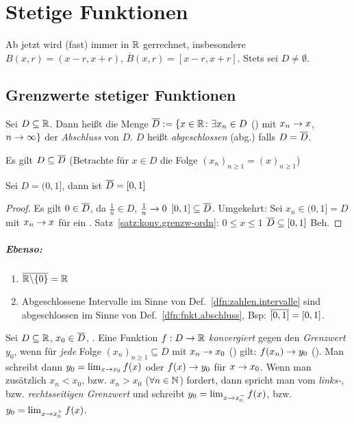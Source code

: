 \documentclass[12pt]{scrreprt}
\begin{document}
\chapter{Stetige Funktionen}
\label{cha:fnkt}
Ab jetzt wird (fast) immer in $\mathbb{R}$ gerrechnet, insbesondere $B(x, r) = (x-r, x+r)$, $\overline{B}(x, r) = [x-r, x+r]$.
Stets sei $D \neq \emptyset$.

\section{Grenzwerte stetiger Funktionen}
\label{sec:fnkt.grenzw-stetigk}
\begin{dfn}\label{dfn:fnkt.abschluss}
Sei $D \subseteq \mathbb{R}$. Dann heißt die Menge $\overline{D} := \{x\in\mathbb{R}\colon \exists x_n\in D$ ()
mit $ x_n \rightarrow x$, $n\rightarrow\infty\}$ der \emph{Abschluss} von $D$. $D$ heißt \emph{abgeschlossen} (abg.) falls $D = \overline{D}$.
\end{dfn}

\begin{bem*}
Es gilt $D \subseteq \overline{D}$ (Betrachte für $x\in D$ die Folge $(x_n)_{n\ge 1} = (x)_{n\ge 1}$)
\end{bem*}

\begin{bsp*}
Sei $D = (0, 1]$, dann ist $\overline{D} = [0, 1]$
\end{bsp*}
\begin{proof}
Es gilt $0\in\overline{D}$, da $\frac{1}{n}\in D$, $\frac{1}{n} \rightarrow 0$  \folgt $[0, 1] \subseteq \overline{D}$. 
Umgekehrt: Sei $x_n \in (0, 1] = D$ mit $x_n \rightarrow x$ für ein . Satz~\ref{satz:konv.grenzw-ordn}: $0\le x\le 1$ \folgt $\overline{D} \subseteq [0,1]$ \folgt Beh.
\end{proof}

\paragraph{Ebenso:}
\begin{enumerate}
\item $\overline{\mathbb{R}\backslash\{0\}} = \mathbb{R}$
\item Abgeschlossene Intervalle im Sinne von Def.~\ref{dfn:zahlen.intervalle} sind abgeschlossen im Sinne 
von Def.~\ref{dfn:fnkt.abschluss}, Bsp: $\overline{[0, 1]} = [0, 1]$.
\end{enumerate}

\begin{dfn}\label{dfn:fnkt.grenzw-fnkt}
Sei $D \subseteq \mathbb{R}$, $x_0 \in \overline{D}$, . Eine Funktion $f: D \rightarrow \mathbb{R}$ \emph{konvergiert}
gegen den \emph{Grenzwert} $y_0$, wenn für \emph{jede} Folge $(x_n)_{n \ge 1} \subseteq D$ mit $x_n \rightarrow x_0$ (\ninf) gilt:
$f(x_n) \rightarrow y_0$ (\ninf). Man schreibt dann $y_0 = \lim_{x\rightarrow x_0} f(x)$ oder $f(x) \rightarrow y_0$ für $x \rightarrow x_0$.
Wenn man zusätzlich $x_n < x_0$, bzw. $x_n > x_0$ ($\forall n\in\mathbb{N}$) fordert, dann spricht man vom \emph{links-}, 
bzw. \emph{rechtsseitigen Grenzwert} und schreibt $y_0 = \lim_{x\rightarrow x_0^-} f(x)$, bzw. $y_0 = \lim_{x\rightarrow x_0^+} f(x)$.
\end{dfn}
\end{document}
